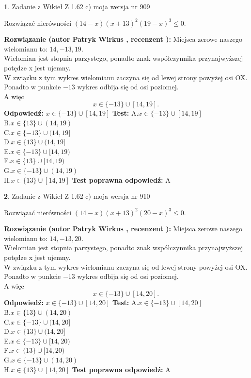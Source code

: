 \documentclass[12pt, a4paper]{article}
\theoremstyle{definition} %
\newtheorem{zad}{}
\newcommand{\zadStart}[1]{\begin{zad}#1\newline}
\newcommand{\zadStop}{\end{zad}}
\newcommand{\rozwStart}[2]{\noindent \textbf{Rozwiązanie (autor #1 , recenzent #2): }\newline}
\newcommand{\rozwStop}{\newline}
\newcommand{\odpStart}{\noindent \textbf{Odpowiedź:}\newline}
\newcommand{\odpStop}{\newline}
\newcommand{\testStart}{\noindent \textbf{Test:}\newline}
\newcommand{\testStop}{\newline}
\newcommand{\kluczStart}{\noindent \textbf{Test poprawna odpowiedź:}\newline}
\newcommand{\kluczStop}{\newline}
\begin{document}
\zadStart{Zadanie z Wikieł Z 1.62 c) moja wersja nr 909}

Rozwiązać nierówności $(14-x)(x+13)^{2}(19-x)^{3}\le0$.
\zadStop
\rozwStart{Patryk Wirkus}{}
Miejsca zerowe naszego wielomianu to: $14, -13, 19$.\\
Wielomian jest stopnia parzystego, ponadto znak współczynnika przy\linebreak najwyższej potędze x jest ujemny.\\ W związku z tym wykres wielomianu zaczyna się od lewej strony powyżej osi OX.\\
Ponadto w punkcie $-13$ wykres odbija się od osi poziomej.\\
A więc $$x \in \{-13\} \cup [14,19].$$
\rozwStop
\odpStart
$x \in \{-13\} \cup [14,19]$
\odpStop
\testStart
A.$x \in \{-13\} \cup [14,19]$\\
B.$x \in \{13\} \cup (14,19)$\\
C.$x \in \{-13\} \cup (14,19]$\\
D.$x \in \{13\} \cup (14,19]$\\
E.$x \in \{-13\} \cup [14,19)$\\
F.$x \in \{13\} \cup [14,19)$\\
G.$x \in \{-13\} \cup (14,19)$\\
H.$x \in \{13\} \cup [14,19]$
\testStop
\kluczStart
A
\kluczStop



\zadStart{Zadanie z Wikieł Z 1.62 c) moja wersja nr 910}

Rozwiązać nierówności $(14-x)(x+13)^{2}(20-x)^{3}\le0$.
\zadStop
\rozwStart{Patryk Wirkus}{}
Miejsca zerowe naszego wielomianu to: $14, -13, 20$.\\
Wielomian jest stopnia parzystego, ponadto znak współczynnika przy\linebreak najwyższej potędze x jest ujemny.\\ W związku z tym wykres wielomianu zaczyna się od lewej strony powyżej osi OX.\\
Ponadto w punkcie $-13$ wykres odbija się od osi poziomej.\\
A więc $$x \in \{-13\} \cup [14,20].$$
\rozwStop
\odpStart
$x \in \{-13\} \cup [14,20]$
\odpStop
\testStart
A.$x \in \{-13\} \cup [14,20]$\\
B.$x \in \{13\} \cup (14,20)$\\
C.$x \in \{-13\} \cup (14,20]$\\
D.$x \in \{13\} \cup (14,20]$\\
E.$x \in \{-13\} \cup [14,20)$\\
F.$x \in \{13\} \cup [14,20)$\\
G.$x \in \{-13\} \cup (14,20)$\\
H.$x \in \{13\} \cup [14,20]$
\testStop
\kluczStart
A
\kluczStop
\end{document}
